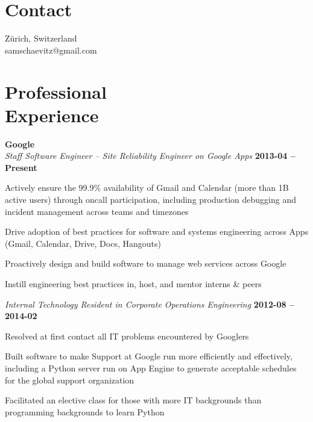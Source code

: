 \documentclass[margin,line]{resume}
\begin{document}
\begin{resume}

    \section{\mysidestyle Contact}

   Z{\"u}rich, Switzerland \\
   samschaevitz@gmail.com          \vspace{0mm}\\\vspace{-4.5mm}%

    \section{\mysidestyle Professional\\Experience}

    \textbf{Google} \vspace{1mm}\\\vspace{0mm}%
    \textsl{Staff Software Engineer -- Site Reliability Engineer on Google Apps} \hfill \textbf{2013-04 -- Present}
    \begin{list2}
		\item Actively ensure the 99.9\% availability of Gmail and Calendar (more than 1B active users) through oncall participation, including production debugging and incident management across teams and timezones
    \item Drive adoption of best practices for software and systems engineering across Apps (Gmail, Calendar, Drive, Docs, Hangouts)
    \item Proactively design and build software to manage web services across Google
    \item Instill engineering best practices in, host, and mentor interns \& peers
    \end{list2}\vspace{-0.5mm}

    \textsl{Internal Technology Resident in Corporate Operations Engineering} \hfill \textbf{2012-08 -- 2014-02}
    \begin{list2}
		\item Resolved at first contact all IT problems encountered by Googlers
    \item Built software to make Support at Google run more efficiently and effectively, including a Python server run on App Engine to generate acceptable schedules for the global support organization
    \item Facilitated an elective class for those with more IT backgrounds than programming backgrounds to learn Python
    \end{list2}\vspace{-1.5mm}


\end{resume}
\end{document}
